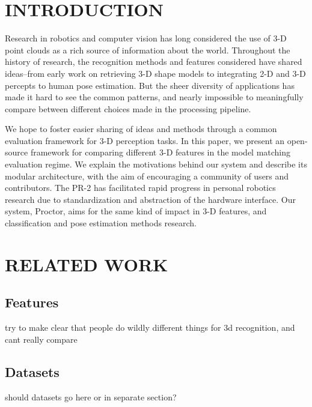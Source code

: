 
\section{INTRODUCTION}
Research in robotics and computer vision has long considered the use of 3-D point clouds as a rich source of information about the world.
Throughout the history of research, the recognition methods and features considered have shared ideas--from early work on retrieving 3-D shape models to integrating 2-D and 3-D percepts to human pose estimation.
But the sheer diversity of applications has made it hard to see the common patterns, and nearly impossible to meaningfully compare between different choices made in the processing pipeline.

We hope to foster easier sharing of ideas and methods through a common evaluation framework for 3-D perception tasks.
In this paper, we present an open-source framework for comparing different 3-D features in the model matching evaluation regime.
We explain the motivations behind our system and describe its modular architecture, with the aim of encouraging a community of users and contributors.
The PR-2  has facilitated rapid progress in personal robotics research due to standardization and abstraction of the hardware interface.
Our system, Proctor, aims for the same kind of impact in 3-D features, and classification and pose estimation methods research.

\section{RELATED WORK}



\subsection{Features}
try to make clear that people do wildly different things for 3d recognition, and cant really compare

\subsection{Datasets}
should datasets go here or in separate section?
